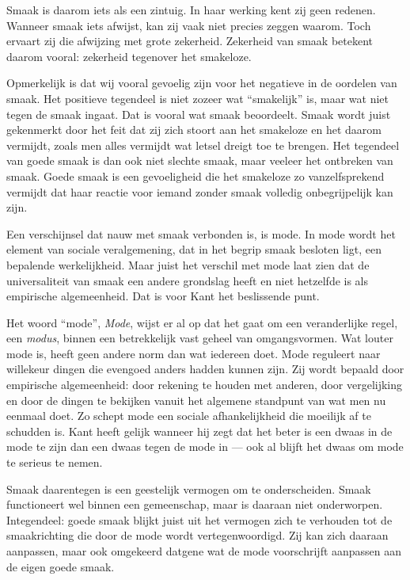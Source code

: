 Smaak is daarom iets als een zintuig. In haar werking kent zij geen redenen. Wanneer smaak iets afwijst, kan zij vaak niet precies zeggen waarom. Toch ervaart zij die afwijzing met grote zekerheid. Zekerheid van smaak betekent daarom vooral: zekerheid tegenover het smakeloze.

Opmerkelijk is dat wij vooral gevoelig zijn voor het negatieve in de oordelen van smaak. Het positieve tegendeel is niet zozeer wat ``smakelijk'' is, maar wat niet tegen de smaak ingaat. Dat is vooral wat smaak beoordeelt. Smaak wordt juist gekenmerkt door het feit dat zij zich stoort aan het smakeloze en het daarom vermijdt, zoals men alles vermijdt wat letsel dreigt toe te brengen. Het tegendeel van goede smaak is dan ook niet slechte smaak, maar veeleer het ontbreken van smaak. Goede smaak is een gevoeligheid die het smakeloze zo vanzelfsprekend vermijdt dat haar reactie voor iemand zonder smaak volledig onbegrijpelijk kan zijn.

Een verschijnsel dat nauw met smaak verbonden is, is mode. In mode wordt het element van sociale veralgemening, dat in het begrip smaak besloten ligt, een bepalende werkelijkheid. Maar juist het verschil met mode laat zien dat de universaliteit van smaak een andere grondslag heeft en niet hetzelfde is als empirische algemeenheid. Dat is voor Kant het beslissende punt.

Het woord ``mode'', \textit{Mode}, wijst er al op dat het gaat om een veranderlijke regel, een \textit{modus}, binnen een betrekkelijk vast geheel van omgangsvormen. Wat louter mode is, heeft geen andere norm dan wat iedereen doet. Mode reguleert naar willekeur dingen die evengoed anders hadden kunnen zijn. Zij wordt bepaald door empirische algemeenheid: door rekening te houden met anderen, door vergelijking en door de dingen te bekijken vanuit het algemene standpunt van wat men nu eenmaal doet. Zo schept mode een sociale afhankelijkheid die moeilijk af te schudden is. Kant heeft gelijk wanneer hij zegt dat het beter is een dwaas in de mode te zijn dan een dwaas tegen de mode in — ook al blijft het dwaas om mode te serieus te nemen.

Smaak daarentegen is een geestelijk vermogen om te onderscheiden. Smaak functioneert wel binnen een gemeenschap, maar is daaraan niet onderworpen. Integendeel: goede smaak blijkt juist uit het vermogen zich te verhouden tot de smaakrichting die door de mode wordt vertegenwoordigd. Zij kan zich daaraan aanpassen, maar ook omgekeerd datgene wat de mode voorschrijft aanpassen aan de eigen goede smaak.

